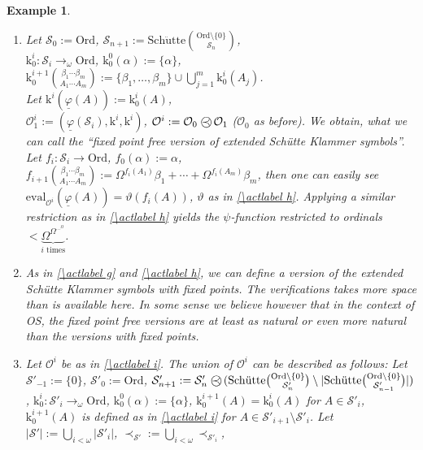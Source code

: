 \documentclass[10pt]{article}
\def \ssubitem#1{\item \label{\actlabel#1} }
\def \refsub#1#2{\ref{#1#2}}                    %
\def \refact#1{\ref{\actlabel#1}}               %
\newtheorem {example}[lemma]{Example}
\def\ar{\rightarrow}
\def \calO{{\mathcal O}}
\def \calS{{\mathcal S}}
\def\k{\mathrm{k}}
\def\eval{\mathrm{eval}}
\def\phibar{{\underline{\varphi}}}
\def\schuette{\mathrm{Sch\ddot{u}tte}}
\def\preccirc{\mathrel{\bigcirc \kern-12pt \prec}} %
\def\Ord{\mathrm{Ord}}
\begin{document}
\begin{example}
{\begin{enumerate}
OS for terms of the form $\phibar(a)$.
\ssubitem i Let $\calS_0:= \Ord$,
$\calS_{n+1}:= \schuette{\binom{\Ord \setminus \{ 0 \}}{\calS_n}}$,\\
$\k^i_0: \calS_i \ar_\omega \Ord$,
$\k^0_0(\alpha):= \{ \alpha \}$,
$\k^{i+1}_0 
{\binom{\beta_1 \cdots \beta_m}{A_1 \cdots A_m}}:=
\{ \beta_1 ,\ldots, \beta_m \} \cup \bigcup_{j=1}^m \k^i_0(A_j)$.\\
Let $\k^i(\phibar(A)):= \k^i_0(A)$,\\
$\calO^i_1:= (\phibar(\calS_i),\k^i,\k^i)$,
$\calO^i:=\calO_0 \preccirc \calO_1$ ($\calO_0$ as before).
We obtain, what we can call the ``fixed point free version of
extended Sch{\"u}tte Klammer symbols''. Let
$f_i: \calS_i \ar \Ord$,
$f_0(\alpha):= \alpha$,
$f_{i+1} 
{\binom{\beta_1 \cdots \beta_m}{A_1 \cdots A_m}}:=
\Omega^{f_i(A_1)}\beta_1 +\cdots+ \Omega^{f_i(A_m)} \beta_m$,
then one can easily see
$\eval_{\calO^i}(\phibar(A))= 
\vartheta(f_i(A))$, $\vartheta$ as in \refact h.
Applying a similar restriction as in \refact h yields
the $\psi$-function restricted to 
ordinals $<\underbrace{\Omega^{\Omega^{\cdots^{\Omega}}}}_{i
\text{ times}}$.\par 
\ssubitem j As in \refact g and \refact h, we can define a 
version of the extended Sch{\"u}tte Klammer symbols with fixed points.
The verifications takes more space than is available here.
In some sense we believe however that in the context of 
OS, the fixed point free versions are at least as natural or 
even more natural than the versions with fixed points.
\ssubitem k Let $\calO^i$ be as in \refact i. 
The union of $\calO^i$ can be described as follows:
Let $\calS'_{-1}:= \{ 0 \}$, $\calS'_0:= \Ord$,
$\calS'_{n+1} := 
\calS'_n \preccirc 
(\schuette{\binom{\Ord \setminus \{ 0 \}}{\calS'_n}} \setminus 
|\schuette{\binom{\Ord \setminus \{ 0 \}}{\calS'_{n-1}}}|)$,
$\k^i_0: \calS'_i \ar_\omega \Ord$,
$\k^0_0(\alpha):= \{ \alpha \} $,
$\k^{i+1}_0(A)= \k^i_0(A)$ for $A \in \calS'_i$,
$\k^{i+1}_0(A)$ is defined as in 
\refact i for $A \in \calS'_{i+1} \setminus 
\calS'_i$.
Let $|\calS'|:= \bigcup_{i< \omega }|\calS'_i|$,
$\prec_{\calS'} := \bigcup_{i<\omega}\prec_{\calS'_i}$,

\end{enumerate}}
\end{example}
\end{document}
